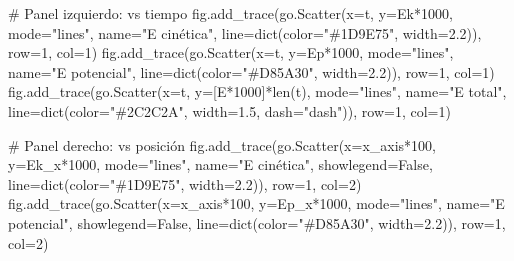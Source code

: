\documentclass[
  letterpaper,
  DIV=11,
  numbers=noendperiod]{scrreprt}
\newenvironment{Shaded}{\begin{snugshade}}{\end{snugshade}}
\newcommand{\BuiltInTok}[1]{\textcolor[rgb]{0.00,0.23,0.31}{#1}}
\newcommand{\CommentTok}[1]{\textcolor[rgb]{0.37,0.37,0.37}{#1}}
\newcommand{\DecValTok}[1]{\textcolor[rgb]{0.68,0.00,0.00}{#1}}
\newcommand{\FloatTok}[1]{\textcolor[rgb]{0.68,0.00,0.00}{#1}}
\newcommand{\NormalTok}[1]{\textcolor[rgb]{0.00,0.23,0.31}{#1}}
\newcommand{\OperatorTok}[1]{\textcolor[rgb]{0.37,0.37,0.37}{#1}}
\newcommand{\StringTok}[1]{\textcolor[rgb]{0.13,0.47,0.30}{#1}}
\newcommand{\VariableTok}[1]{\textcolor[rgb]{0.07,0.07,0.07}{#1}}
\begin{document}
\begin{Shaded}
\begin{Highlighting}[]
\CommentTok{\# Panel izquierdo: vs tiempo}
\NormalTok{fig.add\_trace(go.Scatter(x}\OperatorTok{=}\NormalTok{t, y}\OperatorTok{=}\NormalTok{Ek}\OperatorTok{*}\DecValTok{1000}\NormalTok{, mode}\OperatorTok{=}\StringTok{"lines"}\NormalTok{, name}\OperatorTok{=}\StringTok{"E cinética"}\NormalTok{,}
\NormalTok{    line}\OperatorTok{=}\BuiltInTok{dict}\NormalTok{(color}\OperatorTok{=}\StringTok{"\#1D9E75"}\NormalTok{, width}\OperatorTok{=}\FloatTok{2.2}\NormalTok{)), row}\OperatorTok{=}\DecValTok{1}\NormalTok{, col}\OperatorTok{=}\DecValTok{1}\NormalTok{)}
\NormalTok{fig.add\_trace(go.Scatter(x}\OperatorTok{=}\NormalTok{t, y}\OperatorTok{=}\NormalTok{Ep}\OperatorTok{*}\DecValTok{1000}\NormalTok{, mode}\OperatorTok{=}\StringTok{"lines"}\NormalTok{, name}\OperatorTok{=}\StringTok{"E potencial"}\NormalTok{,}
\NormalTok{    line}\OperatorTok{=}\BuiltInTok{dict}\NormalTok{(color}\OperatorTok{=}\StringTok{"\#D85A30"}\NormalTok{, width}\OperatorTok{=}\FloatTok{2.2}\NormalTok{)), row}\OperatorTok{=}\DecValTok{1}\NormalTok{, col}\OperatorTok{=}\DecValTok{1}\NormalTok{)}
\NormalTok{fig.add\_trace(go.Scatter(x}\OperatorTok{=}\NormalTok{t, y}\OperatorTok{=}\NormalTok{[E}\OperatorTok{*}\DecValTok{1000}\NormalTok{]}\OperatorTok{*}\BuiltInTok{len}\NormalTok{(t), mode}\OperatorTok{=}\StringTok{"lines"}\NormalTok{, name}\OperatorTok{=}\StringTok{"E total"}\NormalTok{,}
\NormalTok{    line}\OperatorTok{=}\BuiltInTok{dict}\NormalTok{(color}\OperatorTok{=}\StringTok{"\#2C2C2A"}\NormalTok{, width}\OperatorTok{=}\FloatTok{1.5}\NormalTok{, dash}\OperatorTok{=}\StringTok{"dash"}\NormalTok{)), row}\OperatorTok{=}\DecValTok{1}\NormalTok{, col}\OperatorTok{=}\DecValTok{1}\NormalTok{)}

\CommentTok{\# Panel derecho: vs posición}
\NormalTok{fig.add\_trace(go.Scatter(x}\OperatorTok{=}\NormalTok{x\_axis}\OperatorTok{*}\DecValTok{100}\NormalTok{, y}\OperatorTok{=}\NormalTok{Ek\_x}\OperatorTok{*}\DecValTok{1000}\NormalTok{, mode}\OperatorTok{=}\StringTok{"lines"}\NormalTok{,}
\NormalTok{    name}\OperatorTok{=}\StringTok{"E cinética"}\NormalTok{, showlegend}\OperatorTok{=}\VariableTok{False}\NormalTok{,}
\NormalTok{    line}\OperatorTok{=}\BuiltInTok{dict}\NormalTok{(color}\OperatorTok{=}\StringTok{"\#1D9E75"}\NormalTok{, width}\OperatorTok{=}\FloatTok{2.2}\NormalTok{)), row}\OperatorTok{=}\DecValTok{1}\NormalTok{, col}\OperatorTok{=}\DecValTok{2}\NormalTok{)}
\NormalTok{fig.add\_trace(go.Scatter(x}\OperatorTok{=}\NormalTok{x\_axis}\OperatorTok{*}\DecValTok{100}\NormalTok{, y}\OperatorTok{=}\NormalTok{Ep\_x}\OperatorTok{*}\DecValTok{1000}\NormalTok{, mode}\OperatorTok{=}\StringTok{"lines"}\NormalTok{,}
\NormalTok{    name}\OperatorTok{=}\StringTok{"E potencial"}\NormalTok{, showlegend}\OperatorTok{=}\VariableTok{False}\NormalTok{,}
\NormalTok{    line}\OperatorTok{=}\BuiltInTok{dict}\NormalTok{(color}\OperatorTok{=}\StringTok{"\#D85A30"}\NormalTok{, width}\OperatorTok{=}\FloatTok{2.2}\NormalTok{)), row}\OperatorTok{=}\DecValTok{1}\NormalTok{, col}\OperatorTok{=}\DecValTok{2}\NormalTok{)}


\end{Highlighting}
\end{Shaded}
\end{document}
